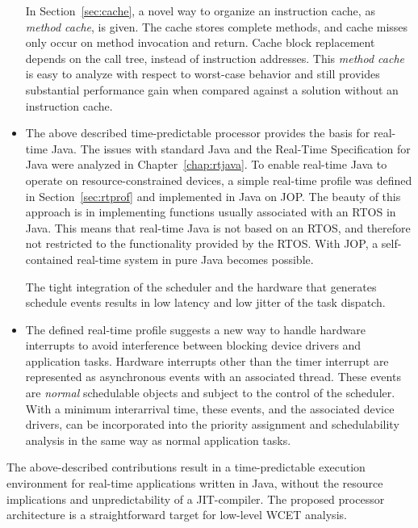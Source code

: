 \begin{itemize}
In Section~\ref{sec:cache}, a novel way to organize an instruction
cache, as \emph{method cache}, is given. The cache stores complete
methods, and cache misses only occur on method invocation and
return. Cache block replacement depends on the call tree, instead of
instruction addresses. This \emph{method cache} is easy to analyze
with respect to worst-case behavior and still provides substantial
performance gain when compared against a solution without an
instruction cache.

    \item
The above described time-predictable processor provides the basis
for real-time Java. The issues with standard Java and the Real-Time
Specification for Java were analyzed in Chapter~\ref{chap:rtjava}.
To enable real-time Java to operate on resource-constrained devices,
a simple real-time profile was defined in Section~\ref{sec:rtprof}
and implemented in Java on JOP. The beauty of this approach is in
implementing functions usually associated with an RTOS in Java. This
means that real-time Java is not based on an RTOS, and therefore not
restricted to the functionality provided by the RTOS. With JOP, a
self-contained real-time system in pure Java becomes possible.

The tight integration of the scheduler and the hardware that
generates schedule events results in low latency and low jitter of
the task dispatch.

    \item
%
The defined real-time profile suggests a new way to handle hardware
interrupts to avoid interference between blocking device drivers and
application tasks. Hardware interrupts other than the timer
interrupt are represented as asynchronous events with an associated
thread. These events are \emph{normal} schedulable objects and
subject to the control of the scheduler. With a minimum interarrival
time, these events, and the associated device drivers, can be
incorporated into the priority assignment and schedulability
analysis in the same way as normal application tasks.

\end{itemize}

The above-described contributions result in a time-predictable
execution environment for real-time applications written in Java,
without the resource implications and unpredictability of a
JIT-compiler. The proposed processor architecture is a
straightforward target for low-level WCET analysis.

